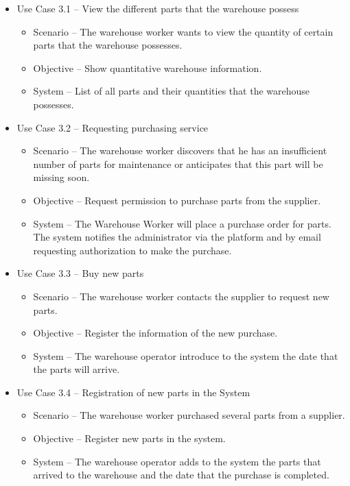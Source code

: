 \begin{itemize}
  \item Use Case 3.1 – View the different parts that the warehouse possess
  \begin{itemize}
    \item Scenario – The warehouse worker wants to view the quantity of certain parts that the warehouse possesses.
    \item Objective – Show quantitative warehouse information.
    \item System – List of all parts and their quantities that the warehouse possesses. 
  \end{itemize}
  \item Use Case 3.2 – Requesting purchasing service 
  \begin{itemize}
    \item Scenario – The warehouse worker discovers that he has an insufficient number of parts for maintenance or anticipates that this part will be missing soon.
    \item Objective – Request permission to purchase parts from the supplier.
    \item System – The Warehouse Worker will place a purchase order for parts. The system notifies the administrator via the platform and by email requesting authorization to make the purchase. 
  \end{itemize}
    \item Use Case 3.3 – Buy new parts
  \begin{itemize}
    \item Scenario – The warehouse worker contacts the supplier to request new parts.
    \item Objective – Register the information of the new purchase.
    \item System – The warehouse operator introduce to the system the date that the parts will arrive.
  \end{itemize}
  \item Use Case 3.4 – Registration of new parts in the System
  \begin{itemize}
    \item Scenario – The warehouse worker purchased several parts from a supplier.
    \item Objective – Register new parts in the system.
    \item System – The warehouse operator adds to the system the parts that arrived to the warehouse and the date that the purchase is completed.
  \end{itemize}

\end{itemize}
